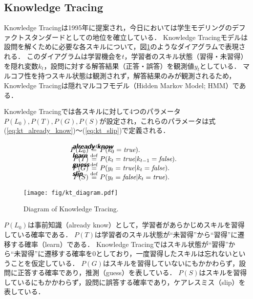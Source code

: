 \subsection{Knowledge Tracing}
Knowledge Tracingは1995年に提案され，今日においては学生モデリングのデファクトスタンダードとしての地位を確立している．
Knowledge Tracingモデルは設問を解くために必要な各スキルについて，図\ref{fig:kt_diagram}のようなダイアグラムで表現される．
このダイアグラムは学習機会を$t$，学習者のスキル状態（習得・未習得）を隠れ変数$k_{t}$，設問に対する解答結果（正答・誤答）を観測値$y_{t}$としている．
マルコフ性を持つスキル状態は観測されず，解答結果のみが観測されるため，Knowledge Tracingは隠れマルコフモデル（Hidden Markov Model; HMM）である．

Knowledge Tracingでは各スキルに対して4つのパラメータ$P(L_{0}),  P(T),  P(G),  P(S)$が設定され，これらのパラメータは式(\ref{eq:kt_already_know})〜(\ref{eq:kt_slip})で定義される．

\vspace{-10mm}
\begin{align}
  \intertext{\ \textsf{\textbf{\itshape already  know}}} \nonumber \\[-11mm]
  P(L_{0}) & \overset{\mathrm{def}}{=} P(k_{0} = \textit{true}). \label{eq:kt_already_know} \\[-3mm]
  \intertext{\ \textsf{\textbf{\itshape learn}}} \nonumber \\[-11mm]
  P(T) & \overset{\mathrm{def}}{=} P(k_{t} = \textit{true} | k_{t-1} = \textit{false} ). \\[-3mm]
  \intertext{\ \textsf{\textbf{\itshape guess}}} \nonumber \\[-11mm]
  P(G) & \overset{\mathrm{def}}{=} P(y_{t} = \textit{true} | k_{t} = \textit{false}). \\[-3mm]
  \intertext{\ \textsf{\textbf{\itshape slip}}} \nonumber \\[-11mm]
  P(S) & \overset{\mathrm{def}}{=} P(y_{t} = \textit{false} | k_{t} = \textit{true}). \label{eq:kt_slip}
\end{align}

\begin{figure}[t]
  \centering \texttt{[image: fig/kt\_diagram.pdf]}
  \caption{Diagram of Knowledge Tracing.}
  \label{fig:kt_diagram}
\end{figure}

$P(L_{0})$は事前知識（already know）として，学習者があらかじめスキルを習得している確率である．
$P(T)$は学習者のスキル状態が``未習得''から\hspace{1em}``習得''に遷移する確率（learn）である．
Knowledge Tracingではスキル状態が``習得''から``未習得''に遷移する確率を$0$としており，一度習得したスキルは忘れないということを仮定している．
$P(G)$はスキルを習得していないにもかかわらず，設問に正答する確率であり，推測（guess）を表している．
$P(S)$はスキルを習得しているにもかかわらず，設問に誤答する確率であり，ケアレスミス（slip）を表している．

